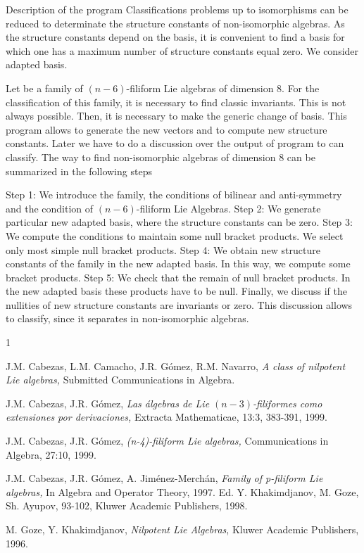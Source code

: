 \begin{section}{Description of the program}
Classifications problems up to isomorphisms can
be reduced to determinate the structure constants
of non-isomorphic algebras. As the structure
constants depend on the basis, it is convenient
to find a basis for which one has a maximum
number of structure constants equal zero. We
consider adapted basis.

Let be a family of $(n-6)$-filiform Lie algebras
of dimension $8$. For the classification of this
family, it is necessary to find classic
invariants. This is not always possible. Then, it
is necessary to make the generic change of basis.
This program allows to generate the new vectors
and to compute new structure constants. Later we
have to do a discussion over the output of program
to can classify.
The way to find non-isomorphic algebras of
dimension $8$ can be summarized in the following
steps

Step 1: We introduce the family, the conditions of
bilinear and anti-symmetry and the condition of
$(n-6)$-filiform Lie Algebras.
\vglue 3mm
Step 2: We generate particular new adapted basis,
where the structure constants can be zero.
Step 3: We compute the conditions to
maintain some null bracket products. We select
only most simple null bracket products.
Step 4: We obtain new structure constants of the
family in the new adapted basis. In this
way, we compute some bracket products.
Step 5: We check that the remain of null bracket
products. In the new adapted basis these products
have to be null.
Finally, we discuss if the nullities of new structure
constants are invariants or zero. This discussion allows to
classify, since it separates in non-isomorphic
algebras.

\end{section}

\begin{thebibliography}{1}

 J.M. Cabezas, L.M. Camacho, J.R. G\'{o}mez, R.M. Navarro,
{\it A class of nilpotent Lie algebras,} Submitted
Communications in Algebra.

  J.M. Cabezas, J.R. G\'{o}mez,
{\it  Las \'{a}lgebras de Lie $(n-3)$-filiformes como
extensiones por derivaciones,} Extracta Mathematicae,
13:3, 383-391, 1999.


  J.M. Cabezas, J.R. G\'{o}mez, {\it  (n-4)-filiform
Lie algebras,} Communications in Algebra,
27:10, 1999.

J.M. Cabezas, J.R. G\'{o}mez, A. Jim\'{e}nez-Merch\'{a}n, {\it Family of p-filiform
Lie algebras,} In Algebra and Operator Theory, 1997. Ed. Y. Khakimdjanov,
M. Goze, Sh. Ayupov, 93-102, Kluwer Academic Publishers, 1998.


 M. Goze, Y. Khakimdjanov, {\it Nilpotent Lie
Algebras}, Kluwer Academic Publishers, 1996.

\end{thebibliography}


